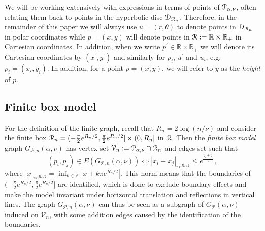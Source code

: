 \begin{remark}\label{rmk:point_notation}
We will be working extensively with expressions in terms of points of ${\mathcal P}_{\alpha, \nu}$, often relating them back to points in the hyperbolic disc ${\mathcal D}_{{\mathcal R}_n}$. Therefore, in the remainder of this paper we will always use $u = (r,\theta)$ to denote points in ${\mathcal D}_{{\mathcal R}_n}$ in polar coordinates while $p = (x,y)$ will denote points in ${\mathcal R} := \mathbb{R} \times \mathbb{R}_+$ in Cartesian coordinates. In addition, when we write $p^\prime \in \mathbb{R} \times \mathbb{R}_+$ we will denote its Cartesian coordinates by $(x^\prime, y^\prime)$ and similarly for $p_i$, $u^\prime$ and $u_i$, e.g. $p_i = (x_i, y_i)$. In addition, for a point $p = (x,y)$, we will refer to $y$ as the \emph{height} of $p$.
\end{remark}



%

\subsection{Finite box model}\label{ssec:finite_model}

For the definition of the finite graph, recall that $R_n = 2\log(n/\nu)$ and consider the finite box ${\mathcal R}_n = (-\frac{\pi}{2}e^{R_n/2}, \frac{\pi}{2}e^{R_n/2}] \times (0, R_n]$ in ${\mathcal R}$. Then the \emph{finite box model} graph $G_{\mathcal{P},n}(\alpha, \nu)$ has vertex set $\mathcal{V}_n := \mathcal{P}_{\alpha, \nu} \cap {\mathcal R}_n$ and edges set such that
\[
	(p_i, p_j) \in E(G_{\mathcal{P},n}(\alpha, \nu)) \iff |x_i - x_j|_{\pi e^{R_n/2}} \leq e^{\frac{y_i + y_j}{2}},
\]
where $|x|_{\pi e^{R_n/2}} = \inf_{k \in \mathbb{Z}} |x + k \pi e^{R_n/2}|$. This norm means that the boundaries of $(-\frac{\pi}{2}e^{R_n/2}, \frac{\pi}{2}e^{R_n/2}]$ are identified, which is done to exclude boundary effects and make the model invariant under horizontal translation and reflections in vertical lines. The graph $G_{\mathcal{P},n}(\alpha, \nu)$ can thus be seen as a subgraph of $G_{\mathcal{P}}(\alpha, \nu)$ induced on $\mathcal{V}_n$, with some addition edges caused by the identification of the boundaries.

